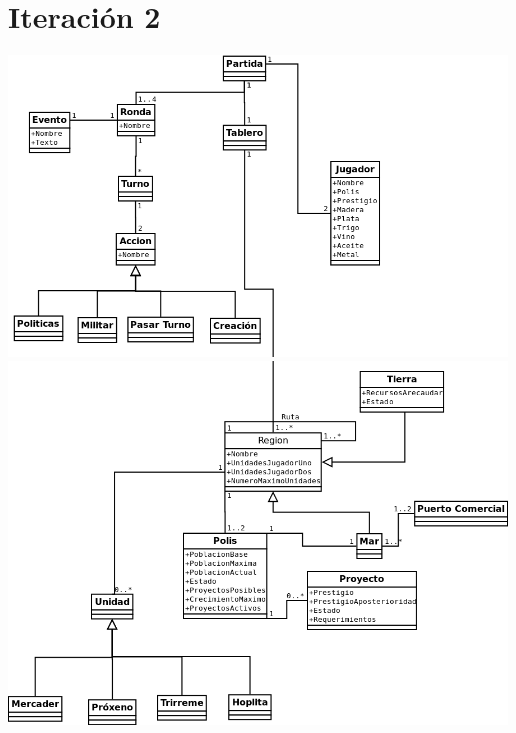 \documentclass[11 pt]{book}
\begin{document}
	\section*{Iteración 2}
		\begin{center}
			\includegraphics[width=500px]{analysis-uml/iteration2/part1.png}
			\includegraphics[width=500px]{analysis-uml/iteration2/part2.png}
		\end{center}
\end{document}
